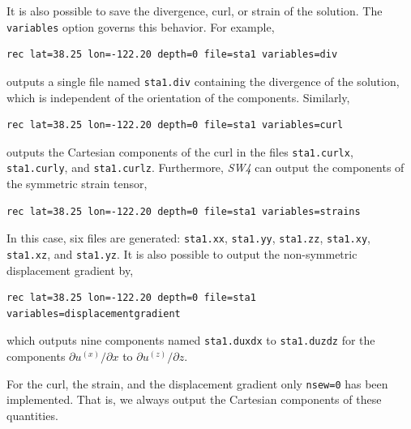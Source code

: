 \documentclass[11pt]{report}
\begin{document}
It is also possible to save the divergence, curl, or strain of the solution. The {\tt variables}
option governs this behavior. For example,
\begin{verbatim}
rec lat=38.25 lon=-122.20 depth=0 file=sta1 variables=div
\end{verbatim}
outputs a single file named {\tt sta1.div} containing the divergence of the solution, which is
independent of the orientation of the components. Similarly,
\begin{verbatim}
rec lat=38.25 lon=-122.20 depth=0 file=sta1 variables=curl
\end{verbatim}
outputs the Cartesian components of the curl in the files {\tt sta1.curlx}, {\tt sta1.curly}, and
{\tt sta1.curlz}. Furthermore, \emph{SW4} can output the components of the symmetric strain tensor,
\begin{verbatim}
rec lat=38.25 lon=-122.20 depth=0 file=sta1 variables=strains
\end{verbatim}
In this case, six files are generated: {\tt sta1.xx}, {\tt sta1.yy}, {\tt sta1.zz}, {\tt sta1.xy},
{\tt sta1.xz}, and {\tt sta1.yz}. It is also possible to output the non-symmetric displacement gradient by,
\begin{verbatim}
rec lat=38.25 lon=-122.20 depth=0 file=sta1 variables=displacementgradient
\end{verbatim}
which outputs nine components named {\tt sta1.duxdx} to {\tt sta1.duzdz} for the components $\partial u^{(x)}/\partial x$
to $\partial u^{(z)}/\partial z$.

For the curl, the strain, and the displacement gradient only \verb+nsew=0+ has been implemented. That is, we always output the
Cartesian components of these quantities.

\end{document}
